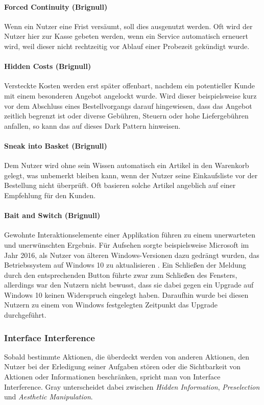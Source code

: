 \documentclass[a4paper]{article}
\begin{document}
\paragraph{Forced Continuity (Brignull)}
Wenn ein Nutzer eine Frist versäumt, soll dies ausgenutzt werden. Oft wird der Nutzer hier zur Kasse gebeten werden, wenn ein Service automatisch erneuert wird, weil dieser nicht rechtzeitig vor Ablauf einer Probezeit gekündigt wurde.

\paragraph{Hidden Costs (Brignull)} 
Versteckte Kosten werden erst später offenbart, nachdem ein potentieller Kunde mit einem besonderen Angebot angelockt wurde. Wird dieser beispielsweise kurz vor dem Abschluss eines Bestellvorgangs darauf hingewiesen, dass das Angebot zeitlich begrenzt ist oder diverse Gebühren, Steuern oder hohe Liefergebühren anfallen, so kann das auf dieses Dark Pattern hinweisen. 

\paragraph{Sneak into Basket (Brignull)}
Dem Nutzer wird ohne sein Wissen automatisch ein Artikel in den Warenkorb gelegt, was unbemerkt bleiben kann, wenn der Nutzer seine Einkaufsliste vor der Bestellung nicht überprüft. Oft basieren solche Artikel angeblich auf einer Empfehlung für den Kunden.

\paragraph{Bait and Switch (Brignull)}
Gewohnte Interaktionselemente einer Applikation führen zu einem unerwarteten und unerwünschten Ergebnis. 
Für Aufsehen sorgte beispielsweise Microsoft im Jahr 2016, als Nutzer von älteren Windows-Versionen dazu gedrängt wurden, das Betriebssystem auf Windows 10 zu aktualisieren \cite{thurrott}. Ein Schließen der Meldung durch den entsprechenden Button führte zwar zum Schließen des Fensters, allerdings war den Nutzern nicht bewusst, dass sie dabei gegen ein Upgrade auf Windows 10 keinen Widerspruch eingelegt haben. Daraufhin wurde bei diesen Nutzern zu einem von Windows festgelegten Zeitpunkt das Upgrade durchgeführt. 

\subsubsection{Interface Interference}
Sobald bestimmte Aktionen, die überdeckt werden von anderen Aktionen, den Nutzer bei der Erledigung seiner Aufgaben stören oder die Sichtbarkeit von Aktionen oder Informationen beschränken, spricht man von Interface Interference. 
Gray \cite{gray} unterscheidet dabei zwischen \textit{Hidden Information}, \textit{Preselection} und \textit{Aesthetic Manipulation}. 
\end{document}
